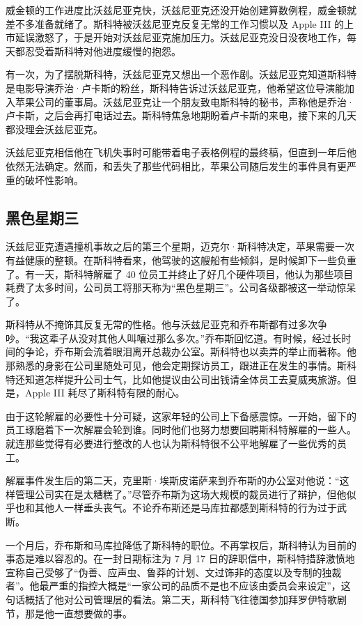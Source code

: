 \documentclass[12pt,UTF8]{ctexbook}
\begin{document}
威金顿的工作进度比沃兹尼亚克快，沃兹尼亚克还没开始创建算数例程，威金顿就差不多准备就绪了。斯科特被沃兹尼亚克反复无常的工作习惯以及 Apple III 的上市延误激怒了，于是开始对沃兹尼亚克施加压力。沃兹尼亚克没日没夜地工作，每天都忍受着斯科特对他进度缓慢的抱怨。

有一次，为了摆脱斯科特，沃兹尼亚克又想出一个恶作剧。沃兹尼亚克知道斯科特是电影导演乔治·卢卡斯的粉丝，斯科特告诉过沃兹尼亚克，他希望这位导演能加入苹果公司的董事局。沃兹尼亚克让一个朋友致电斯科特的秘书，声称他是乔治·卢卡斯，之后会再打电话过去。斯科特焦急地期盼着卢卡斯的来电，接下来的几天都没理会沃兹尼亚克。

沃兹尼亚克相信他在飞机失事时可能带着电子表格例程的最终稿，但直到一年后他依然无法确定。然而，和丢失了那些代码相比，苹果公司随后发生的事件具有更严重的破坏性影响。





\subsection{黑色星期三}


沃兹尼亚克遭遇撞机事故之后的第三个星期，迈克尔·斯科特决定，苹果需要一次有益健康的整顿。在斯科特看来，他驾驶的这艘船有些倾斜，是时候卸下一些负重了。有一天，斯科特解雇了 40 位员工并终止了好几个硬件项目，他认为那些项目耗费了太多时间，公司员工将那天称为“黑色星期三”。公司各级都被这一举动惊呆了。

斯科特从不掩饰其反复无常的性格。他与沃兹尼亚克和乔布斯都有过多次争吵。“我这辈子从没对其他人叫嚷过那么多次。”乔布斯回忆道。有时候，经过长时间的争论，乔布斯会流着眼泪离开总裁办公室。斯科特也以卖弄的举止而著称。他那熟悉的身影在公司里随处可见，他会定期探访员工，跟进正在发生的事情。斯科特还知道怎样提升公司士气，比如他提议由公司出钱请全体员工去夏威夷旅游。但是，Apple III 耗尽了斯科特有限的耐心。

由于这轮解雇的必要性十分可疑，这家年轻的公司上下备感震惊。一开始，留下的员工琢磨着下一次解雇会轮到谁。同时他们也努力想要回聘斯科特解雇的一些人。就连那些觉得有必要进行整改的人也认为斯科特很不公平地解雇了一些优秀的员工。

解雇事件发生后的第二天，克里斯·埃斯皮诺萨来到乔布斯的办公室对他说：“这样管理公司实在是太糟糕了。”尽管乔布斯为这场大规模的裁员进行了辩护，但他似乎也和其他人一样垂头丧气。不论乔布斯还是马库拉都感到斯科特的行为过于武断。

一个月后，乔布斯和马库拉降低了斯科特的职位。不再掌权后，斯科特认为目前的事态是难以容忍的。在一封日期标注为 7 月 17 日的辞职信中，斯科特措辞激愤地宣称自己受够了“伪善、应声虫、鲁莽的计划、文过饰非的态度以及专制的独裁者”。他最严重的指控大概是“一家公司的品质不是也不应该由委员会来设定”，这句话概括了他对公司管理层的看法。第二天，斯科特飞往德国参加拜罗伊特歌剧节，那是他一直想要做的事。
\end{document}
